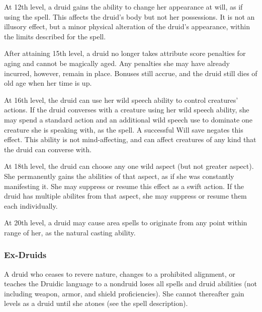  At 12th level, a druid gains the ability to change
her appearance at will, as if using the  spell. This affects the druid's body but not her possessions. It is not an illusory effect, but a minor physical alteration of the druid's appearance, within the limits described for the spell.

 After attaining 15th level, a druid no longer takes attribute score penalties for aging and cannot be magically aged. Any penalties she may have already incurred, however, remain in place. Bonuses still accrue, and the druid still dies of old age when her time is up.

 At 16th level, the druid can use her wild speech ability to control creatures' actions. If the druid converses with a creature using her wild speech ability, she may spend a standard action and an additional wild speech use to dominate one creature she is speaking with, as the  spell. A successful Will save negates this effect. This ability is not mind-affecting, and can affect creatures of any kind that the druid can converse with.

 At 18th level, the druid can choose any one wild aspect (but not greater aspect). She permanently gains the abilities of that aspect, as if she was constantly manifesting it. She may suppress or resume this effect as a swift action. If the druid has multiple abilites from that aspect, she may suppress or resume them each individually.

 At 20th level, a druid may cause area spells to originate from any point within \rngmed range of her, as the natural casting ability.
\subsubsection{Ex-Druids}
A druid who ceases to revere nature, changes to a prohibited alignment, or teaches the Druidic language to a nondruid loses all spells and druid abilities (not including weapon, armor, and shield proficiencies). She cannot thereafter gain levels as a druid until she atones (see the  spell description).

